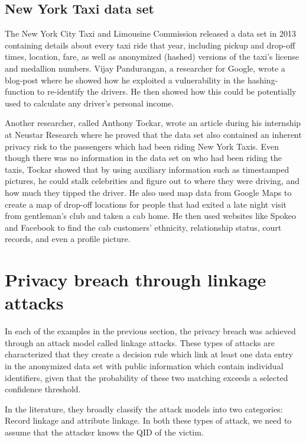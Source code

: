 \subsection{New York Taxi data set} 
The New York City Taxi and Limousine Commission released a data set in 2013 containing details about every taxi ride that year, including pickup and drop-off times, location, fare, as well as anonymized (hashed) versions of the taxi's license and medallion numbers. Vijay Pandurangan, a researcher for Google, wrote a blog-post where he showed how he exploited a vulnerability in the hashing-function to re-identify the drivers. He then showed how this could be potentially used to calculate any driver's personal income\citep{vijay2014online}. 

Another researcher, called Anthony Tockar, wrote an article during his internship at Neustar Research where he proved that the data set also contained an inherent privacy risk to the passengers which had been riding New York Taxis. Even though there was no information in the data set on who had been riding the taxis, Tockar showed that by using auxiliary information such as timestamped pictures, he could stalk celebrities and figure out to where they were driving, and how much they tipped the driver. He also used map data from Google Maps to create a map of drop-off locations for people that had exited a late night visit from gentleman's club and taken a cab home. He then used websites like Spokeo and Facebook to find the cab customers' ethnicity, relationship status, court records, and even a profile picture\citep{tockar2014online}.

\section{Privacy breach through linkage attacks}
\label{sec:attack_vectors}
In each of the examples in the previous section, the privacy breach was achieved through an attack model called linkage attacks. These types of attacks are characterized that they create a decision rule which link at least one data entry in the anonymized data set with public information which contain individual identifiers, given that the probability of these two matching exceeds a selected confidence threshold. 

In the literature\citep{bonchi2010privacybook,fung2010privacybook}, they broadly classify the attack models into two categories: Record linkage and attribute linkage. In both these types of attack, we need to assume that the attacker knows the QID of the victim.

